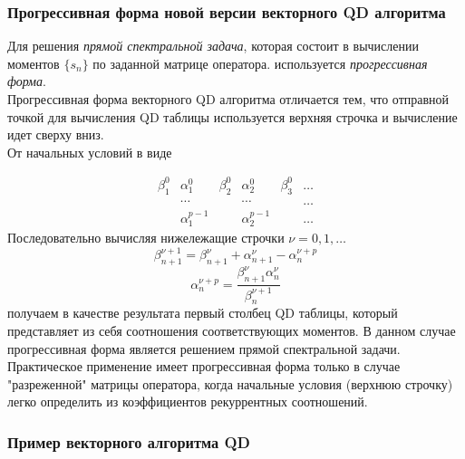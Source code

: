 \subsubsection{Прогрессивная форма новой версии векторного QD алгоритма}

Для решения \emph {прямой спектральной задача}, которая состоит в
вычислении моментов $\{s_n\}$ по заданной матрице оператора.
используется \emph {прогрессивная форма}. \\
Прогрессивная форма векторного QD алгоритма отличается тем, что
отправной точкой для вычисления QD таблицы используется верхняя
строчка и вычисление идет сверху вниз. \\ От начальных условий в
виде

\begin{equation}
\begin{array}{ccccccccccccccccc}
\beta_1^0 & \alpha_1^0 & \beta_2^0 & \alpha_2^0 & \beta_3^0 &
\ldots \\
 & \cdots &  & \cdots &  &
\ldots \\
 & \alpha_1^{p-1} &  & \alpha_2^{p-1} &  &
\ldots
\end{array}
\end{equation}
Последовательно вычисляя нижележащие строчки $\nu =0, 1, \ldots $
$$\beta_{n+1}^{\nu+1}=\beta_{n+1}^{\nu}+\alpha_{n+1}^{\nu}-\alpha_{n}^{\nu+p}$$
$$\alpha_{n}^{\nu+p}=\displaystyle\frac{\beta_{n+1}^{\nu}\alpha_{n}^{\nu}} {\beta_{n}^{\nu+1}}$$
получаем в качестве результата первый столбец QD таблицы, который
представляет из себя соотношения соответствующих моментов. В
данном случае прогрессивная форма является решением прямой
спектральной задачи. \\
Практическое применение имеет прогрессивная
форма только в случае "разреженной" матрицы оператора, когда
начальные условия (верхнюю строчку) легко определить из
коэффициентов рекуррентных соотношений.



\subsubsection{Пример векторного алгоритма QD}

